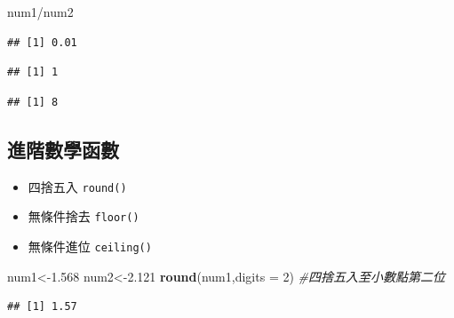 \documentclass[]{book}
\newenvironment{Shaded}{\begin{snugshade}}{\end{snugshade}}
\newcommand{\KeywordTok}[1]{\textcolor[rgb]{0.13,0.29,0.53}{\textbf{{#1}}}}
\newcommand{\DataTypeTok}[1]{\textcolor[rgb]{0.13,0.29,0.53}{{#1}}}
\newcommand{\DecValTok}[1]{\textcolor[rgb]{0.00,0.00,0.81}{{#1}}}
\newcommand{\FloatTok}[1]{\textcolor[rgb]{0.00,0.00,0.81}{{#1}}}
\newcommand{\CommentTok}[1]{\textcolor[rgb]{0.56,0.35,0.01}{\textit{{#1}}}}
\newcommand{\NormalTok}[1]{{#1}}
\providecommand{\tightlist}{%
  \setlength{\itemsep}{0pt}\setlength{\parskip}{0pt}}
\theoremstyle{definition}
\theoremstyle{definition}
\theoremstyle{remark}
\begin{document}
\begin{Shaded}
\begin{Highlighting}[]
\NormalTok{num1/num2}
\end{Highlighting}
\end{Shaded}

\begin{verbatim}
## [1] 0.01
\end{verbatim}

\begin{Shaded}
\end{Shaded}

\begin{verbatim}
## [1] 1
\end{verbatim}

\begin{Shaded}
\end{Shaded}

\begin{verbatim}
## [1] 8
\end{verbatim}

\subsection{進階數學函數}

\begin{itemize}
\tightlist
\item
  四捨五入 \texttt{round()}
\item
  無條件捨去 \texttt{floor()}
\item
  無條件進位 \texttt{ceiling()}
\end{itemize}

\begin{Shaded}
\begin{Highlighting}[]
\NormalTok{num1<-}\FloatTok{1.568}
\NormalTok{num2<-}\FloatTok{2.121}
\KeywordTok{round}\NormalTok{(num1,}\DataTypeTok{digits =} \DecValTok{2}\NormalTok{) }\CommentTok{#四捨五入至小數點第二位}
\end{Highlighting}
\end{Shaded}

\begin{verbatim}
## [1] 1.57
\end{verbatim}
\end{document}
